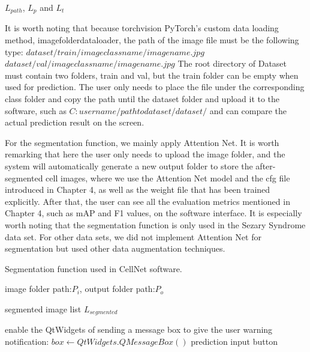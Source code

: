 {\begin{algorithm}[b]
\begin{algorithmic}[1]
    \EndIf \newline
   \Return  $L_{path}$, $L_{p}$ and $L_{t}$
  \end{algorithmic}
\end{algorithm}



It is worth noting that because torchvision PyTorch's custom data loading method, imagefolderdataloader, the path of the image file must be the following type:\newline
$dataset/train/imageclassname/imagename.jpg$ \newline
$dataset/val/imageclassname/imagename.jpg$\newline
The root directory of Dataset must contain two folders, train and val, but the train folder can be empty when used for prediction. The user only needs to place the file under the corresponding class folder and copy the path until the dataset folder and upload it to the software, such as $C:username/pathtodataset/dataset/ $ and can compare the actual prediction result on the screen.



For the segmentation function, we mainly apply Attention Net. It is worth remarking that here the user only needs to upload the image folder, and the system will automatically generate a new output folder to store the after-segmented cell images, where we use the Attention Net model and the cfg file introduced in Chapter 4, as well as the weight file that has been trained explicitly. After that, the user can see all the evaluation metrics mentioned in Chapter 4, such as mAP and F1 values, on the software interface. 
It is especially worth noting that the segmentation function is only used in the Sezary Syndrome data set. For other data sets, we did not implement Attention Net for segmentation but used other data augmentation techniques.




\begin{algorithm}[t]
  \caption{Segmentation function used in CellNet software.}
  \label{alg:Framwork}
  \begin{algorithmic}[1]
    \Require
    image folder path:$P_{i}$, output folder path:$P_{o}$
    
    \Ensure
     segmented image list $L_{segmented}$
  
      
      \State  enable the QtWidgets of sending a message box to give the user warning notification: $box  \gets QtWidgets.QMessageBox()$
      \State  \set prediction input button \false
      

\end{algorithmic}
\end{algorithm}}
